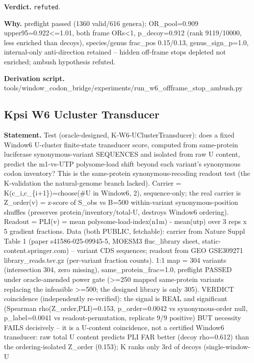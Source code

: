 \textbf{Verdict.} \texttt{refuted}.

\textbf{Why.} preflight passed (1360 valid/616 genera); OR\_pool=0.909 upper95=0.922<=1.01, both frame ORs<1,
p\_decoy=0.912 (rank 9119/10000, less enriched than decoys), species/genus frac\_pos 0.15/0.13,
genus\_sign\_p=1.0, internal-only anti-direction retained -- hidden off-frame stops depleted not
enriched; ambush hypothesis refuted.

\textbf{Derivation script.} tools/window\_codon\_bridge/experiments/run\_w6\_offframe\_stop\_ambush.py

\subsection{Kpsi W6 Ucluster Transducer}\label{sec:bridge-kpsi-w6-ucluster-transducer}
\textbf{Statement.} Test (oracle-designed, K-W6-UClusterTransducer): does a fixed Window6 U-cluster finite-state
transducer score, computed from same-protein luciferase synonymous-variant SEQUENCES and isolated
from raw U content, predict the m1-vs-UTP polysome-load shift beyond each variant's synonymous codon
inventory? This is the same-protein synonymous-recoding readout test (the K-validation the
natural-genome branch lacked). Carrier = K(c\_i,c\_\{i+1\})=choose(\#U in Window6, 2),
sequence-only; the real carrier is Z\_order(v) = z-score of S\_obs vs B=500 within-variant
synonymous-position shuffles (preserves protein/inventory/total-U, destroys Window6 ordering).
Readout = PLI(v) = mean polysome-load-index(n1m) - mean(utp) over 3 reps x 5 gradient fractions.
Data (both PUBLIC, fetchable): carrier from Nature Suppl Table 1 (paper s41586-025-09945-5, MOESM3
fluc\_library sheet, static-content.springer.com) -- variant CDS sequences; readout from GEO
GSE309271 library\_reads.tsv.gz (per-variant fraction counts). 1:1 map = 304 variants (intersection
304, zero missing), same\_protein\_frac=1.0, preflight PASSED under oracle-amended power gate (>=250
mapped same-protein variants replacing the infeasible >=500; the designed library is only 305).
VERDICT coincidence (independently re-verified): the signal is REAL and significant (Spearman
rho(Z\_order,PLI)=0.153, p\_order=0.0042 vs synonymous-order null, p\_label=0.0041 vs
readout-permutation, replicate 9/9 positive) BUT necessity FAILS decisively -- it is a U-content
coincidence, not a certified Window6 transducer: raw total U content predicts PLI FAR better (decoy
rho=0.612) than the ordering-isolated Z\_order (0.153); K ranks only 3rd of decoys (single-window-U
